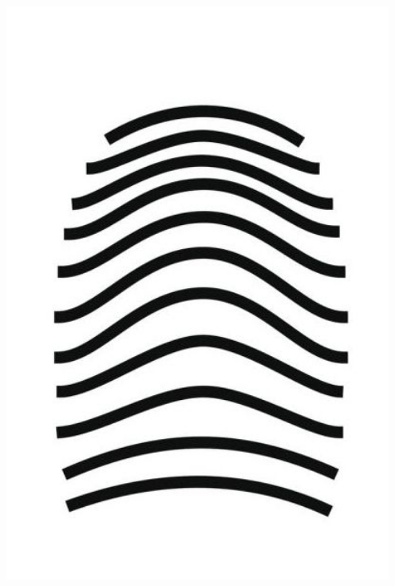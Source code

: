 \documentclass[letter]{amsart}
\begin{document}
\begin{minipage}[H]{0.33\textwidth}
    \centering
    \includegraphics[width=0.95\textwidth]{fingerprintARCH.jpeg}
\end{minipage}
\end{document}
